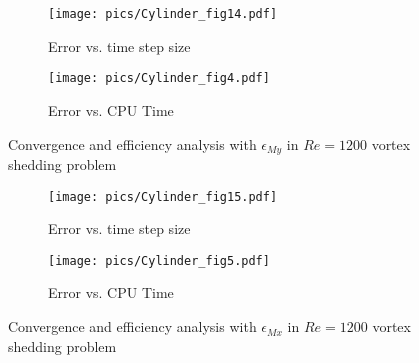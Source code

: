 

\begin{figure}[htbp]
    \centering
    \begin{subfigure}{0.5\textwidth}
        \texttt{[image: pics/Cylinder\_fig14.pdf]}
        \caption[]{Error vs. time step size}
        \label{sfig:CylinderRe1200_My_C}
    \end{subfigure}\hfill
    \begin{subfigure}{0.5\textwidth}
        \texttt{[image: pics/Cylinder\_fig4.pdf]}
        \caption[]{Error vs. CPU Time}
        \label{sfig:CylinderRe1200_My_E}
    \end{subfigure}
    \caption[]{Convergence and efficiency analysis with $\epsilon_{My}$ in $Re=1200$ vortex shedding problem}
    \label{fig:CylinderRe1200_My}
\end{figure}

\begin{figure}[htbp]
    \centering
    \begin{subfigure}{0.5\textwidth}
        \texttt{[image: pics/Cylinder\_fig15.pdf]}
        \caption[]{Error vs. time step size}
        \label{sfig:CylinderRe1200_Mx_C}
    \end{subfigure}\hfill
    \begin{subfigure}{0.5\textwidth}
        \texttt{[image: pics/Cylinder\_fig5.pdf]}
        \caption[]{Error vs. CPU Time}
        \label{sfig:CylinderRe1200_Mx_E}
    \end{subfigure}
    \caption[]{Convergence and efficiency analysis with $\epsilon_{Mx}$ in $Re=1200$ vortex shedding problem}
    \label{fig:CylinderRe1200_Mx}
\end{figure}

